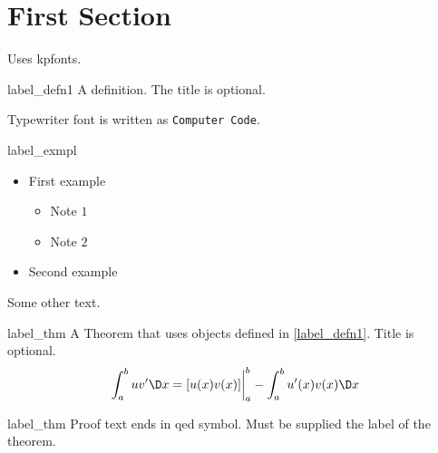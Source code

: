\documentclass{worksheet}
\begin{document}
    \thispagestyle{empty}
	\maketitle
    \vspace{-1em}
	
 
	\section{First Section}
    
    Uses kpfonts.
	
	\begin{defn}{label_defn1}
	A definition. The title is optional.
	\end{defn}
	    
	Typewriter font is written as {\tt Computer Code}.
	
	\begin{exmpl}[Title]{label_exmpl}
	 \begin{itemize}
        \item First example 
        \begin{itemize}
            \item  Note $1$
            \item  Note $2$
        \end{itemize}
        \item Second example
    \end{itemize}
	\end{exmpl}    


    
	Some other text.
	
	\begin{theo}{label_thm}
	A Theorem that uses objects defined in \cref{label_defn1}. Title is optional. 
	\[\dint_a^b u v' \dx = [u(x)v(x)] \eval_a^b - \dint_a^b u'(x) v(x) \dx\]
	\end{theo}
	
    
    \begin{prf}{label_thm}
    Proof text ends in qed symbol. Must be supplied the label of the theorem.
    \end{prf}
    

    
\end{document}
